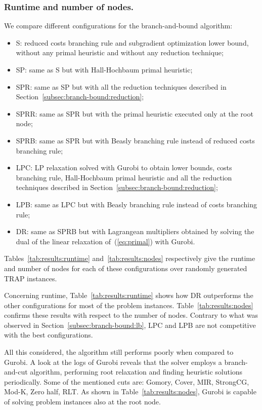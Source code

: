 \documentclass[runningheads]{llncs}
\begin{document}
\subsubsection{Runtime and number of nodes.} We compare different configurations for the branch-and-bound algorithm:
\begin{itemize}
  \item S: reduced costs branching rule and subgradient optimization lower bound, without any primal heuristic and without any reduction technique;
  \item SP: same as S but with Hall-Hochbaum primal heuristic;
  \item SPR: same as SP but with all the reduction techniques described in Section~\ref{subsec:branch-bound:reduction};
  \item SPRR: same as SPR but with the primal heuristic executed only at the root node;
  \item SPRB: same as SPR but with Beasly branching rule instead of reduced costs branching rule;
  \item LPC: LP relaxation solved with Gurobi to obtain lower bounds, costs branching rule, Hall-Hochbaum primal heuristic and all the reduction techniques described in Section~\ref{subsec:branch-bound:reduction};
  \item LPB: same as LPC but with Beasly branching rule instead of costs branching rule;
  \item DR: same as SPRB but with Lagrangean multipliers obtained by solving the dual of the linear relaxation of~(\ref{eq:primal}) with Gurobi.
\end{itemize}

Tables~\ref{tab:results:runtime} and~\ref{tab:results:nodes} respectively give the runtime and number of nodes for each of these configurations over randomly generated TRAP instances. 


Concerning runtime, Table~\ref{tab:results:runtime} shows how DR outperforms the other configurations for most of the problem instances. Table~\ref{tab:results:nodes} confirms these results with respect to the number of nodes. Contrary to what was observed in Section~\ref{subsec:branch-bound:lb}, LPC and LPB are not competitive with the best configurations. 

All this considered, the algorithm still performs poorly when compared to Gurobi. A look at the logs of Gurobi reveals that the solver employs a branch-and-cut algorithm, performing root relaxation and finding heuristic solutions periodically. Some of the mentioned cuts are: Gomory, Cover, MIR, StrongCG, Mod-K, Zero half, RLT. As shown in Table~\ref{tab:results:nodes}, Gurobi is capable of solving problem instances also at the root node. 
\end{document}
